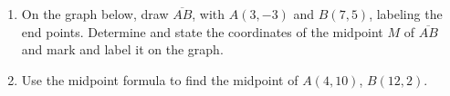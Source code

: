 \documentclass[12pt, twoside]{article}
\begin{document}
\begin{enumerate}
  \item On the graph below, draw $\overline{AB}$, with $A(3,-3)$ and $B(7,5)$, labeling the end points. Determine and state the coordinates of the midpoint $M$ of $\overline{AB}$ and mark and label it on the graph.
  \begin{flushright}
  \end{flushright}

\item Use the midpoint formula to find the midpoint of $A(4,10)$, $B(12,2)$.

\end{enumerate}
\end{document}

